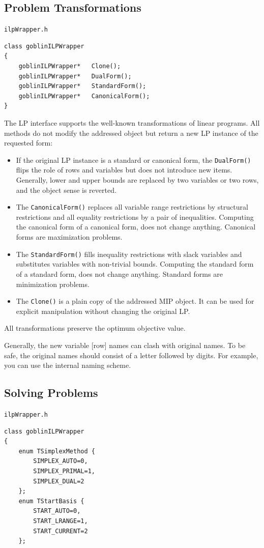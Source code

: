 \documentclass[a4paper,11pt,twoside]{book}
\begin{document}
\begin{multicols}{2}
\subsection{Problem Transformations}
\myinclude\verb/ilpWrapper.h/
\begin{mymethods}
\begin{verbatim}
class goblinILPWrapper
{
    goblinILPWrapper*   Clone();
    goblinILPWrapper*   DualForm();
    goblinILPWrapper*   StandardForm();
    goblinILPWrapper*   CanonicalForm();
}
\end{verbatim}
\end{mymethods}
The LP interface supports the well-known transformations of linear programs.
All methods do not modify the addressed object but return a new LP
instance of the requested form:
\begin{itemize}
\item If the original LP instance is a standard or canonical form, the
    \verb/DualForm()/ flips the role of rows and variables but does not
    introduce new items. Generally, lower and upper bounds are replaced by
    two variables or two rows, and the object sense is reverted.
\item The \verb/CanonicalForm()/ replaces all variable range restrictions by
    structural restrictions and all equality restrictions by a pair of
    inequalities. Computing the canonical form of a canonical form, does not
    change anything. Canonical forms are maximization problems.
\item The \verb/StandardForm()/ fills inequality restrictions with slack
    variables and substitutes variables with non-trivial bounds. Computing the
    standard form of a standard form, does not change anything. Standard forms
    are minimization problems.
\item The \verb/Clone()/ is a plain copy of the addressed MIP object. It can be
    used for explicit manipulation without changing the original LP.
\end{itemize}
All transformations preserve the optimum objective value.

Generally, the new variable [row] names can clash with original names. To be
safe, the original names should consist of a letter followed by digits. For
example, you can use the internal naming scheme.


\newpage
\subsection{Solving Problems}
\myinclude\verb/ilpWrapper.h/
\label{slb_solve_lp}
\begin{mymethods}
\begin{verbatim}
class goblinILPWrapper
{
    enum TSimplexMethod {
        SIMPLEX_AUTO=0,
        SIMPLEX_PRIMAL=1,
        SIMPLEX_DUAL=2
    };
    enum TStartBasis {
        START_AUTO=0,
        START_LRANGE=1,
        START_CURRENT=2
    };


\end{verbatim}
\end{mymethods}
\end{multicols}
\end{document}
